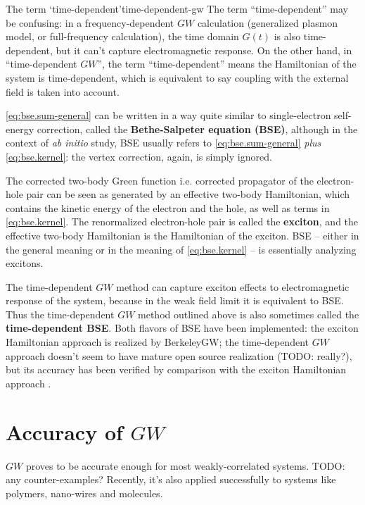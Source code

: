 \documentclass[hyperref, a4paper]{report}
\newcommand*{\concept}[1]{{\textbf{#1}}}
\newcommand*{\abinitio}{\textit{ab initio}}
\begin{document}
\begin{infobox}{The term `time-dependent'}{time-dependent-gw}
    The term ``time-dependent'' may be confusing:
    in a frequency-dependent $GW$ calculation 
    (generalized plasmon model, or full-frequency calculation),
    the time domain $G(t)$ is also time-dependent,
    but it can't capture electromagnetic response.
    On the other hand, in ``time-dependent $GW$'',
    the term ``time-dependent''
    means the Hamiltonian of the system is time-dependent,
    which is equivalent to say coupling with the external field 
    is taken into account. 
\end{infobox}

\eqref{eq:bse.sum-general} can be written in a way 
quite similar to single-electron self-energy correction,
called the \concept{Bethe-Salpeter equation (BSE)},
although in the context of \abinitio{} study, 
BSE usually refers to \eqref{eq:bse.sum-general} \emph{plus} \eqref{eq:bse.kernel}:
the vertex correction, again, is simply ignored.

The corrected two-body Green function i.e. corrected propagator of the electron-hole pair 
can be seen as generated by 
an effective two-body Hamiltonian,
which contains the kinetic energy of the electron and the hole,
as well as terms in \eqref{eq:bse.kernel}.
The renormalized electron-hole pair 
is called the \concept{exciton},
and the effective two-body Hamiltonian is the Hamiltonian of the exciton. 
BSE -- either in the general meaning or in the meaning of \eqref{eq:bse.kernel} -- 
is essentially analyzing excitons.

The time-dependent $GW$ method 
can capture exciton effects to electromagnetic response of the system,
because in the weak field limit 
it is equivalent to BSE.
Thus the time-dependent $GW$ method outlined above 
is also sometimes called the \concept{time-dependent BSE}.
Both flavors of BSE have been implemented:
the exciton Hamiltonian approach is realized by BerkeleyGW;
the time-dependent $GW$ approach doesn't seem to have mature open source realization (TODO: really?),
but its accuracy has been verified by comparison with the exciton Hamiltonian approach
\cite{attaccalite2011real}.

\section{Accuracy of $GW$}


$GW$ proves to be accurate enough for most weakly-correlated systems.
TODO: any counter-examples?
Recently, it's also applied successfully to systems like polymers, nano-wires and molecules.
\end{document}
